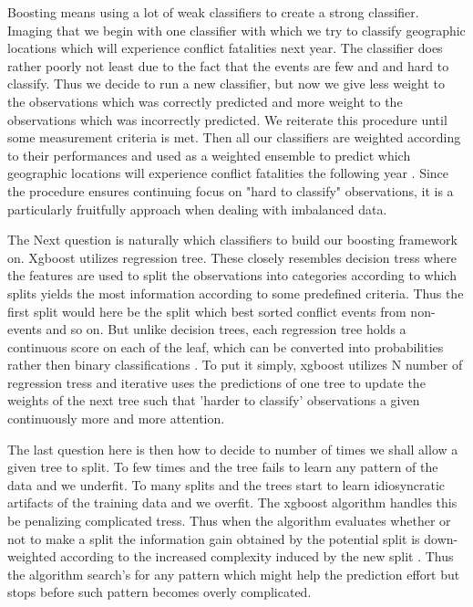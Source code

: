 \documentclass[a4paper]{article}
\begin{document}
Boosting means using a lot of weak classifiers to create a strong classifier. Imaging that we begin with one classifier with which we try to classify geographic locations which will experience conflict fatalities next year. The classifier does rather poorly not least due to the fact that the events are few and and hard to classify. Thus we decide to run a new classifier, but now we give less weight to the observations which was correctly predicted and more weight to the observations which was incorrectly predicted. We reiterate this procedure until some measurement criteria is met. Then all our classifiers are weighted according to their performances and used as a weighted ensemble to predict which geographic locations will experience conflict fatalities the following year \citep[338-339]{Friedman_2001}. Since the procedure ensures continuing focus on "hard to classify" observations, it is a particularly fruitfully approach when dealing with imbalanced data.\par

The Next question is naturally which classifiers to build our boosting framework on. Xgboost utilizes regression tree. These closely resembles decision tress where the features are used to split the observations into categories according to which splits yields the most information according to some predefined criteria. Thus the first split would here be the split which best sorted conflict events from non-events and so on. But unlike decision trees, each regression tree holds a continuous score on each of the leaf, which can be converted into probabilities rather then binary classifications \citep[2]{Chen_2016}. To put it simply, xgboost utilizes N number of regression tress and iterative uses the predictions of one tree to update the weights of the next tree such that 'harder to classify' observations a given continuously more and more attention.\par

The last question here is then how to decide to number of times we shall allow a given tree to split. To few times and the tree fails to learn any pattern of the data and we underfit. To many splits and the trees start to learn idiosyncratic artifacts of the training data and we overfit. The xgboost algorithm handles this be penalizing complicated tress. Thus when the algorithm evaluates whether or not to make a split the information gain obtained by the potential split is down-weighted according to the increased complexity induced by the new split \cite[4-7]{Chen_2016}. Thus the algorithm search's for any pattern which might help the prediction effort but stops before such pattern becomes overly complicated.\par 
\end{document}
